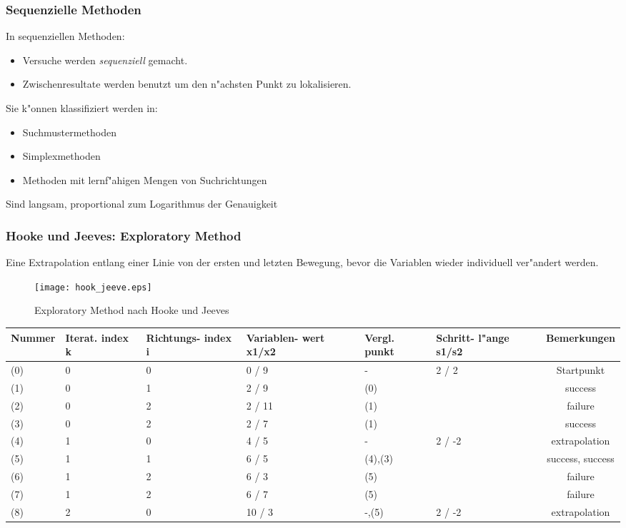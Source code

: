 \documentclass[german, 10pt, a4paper, twocolumn]{scrartcl}
\begin{document}
\subsubsection{Sequenzielle Methoden}

In sequenziellen Methoden:

\begin{itemize}
	\item Versuche werden \textit{sequenziell} gemacht.
	\item Zwischenresultate werden benutzt um den n"achsten Punkt zu lokalisieren.
\end{itemize}

Sie k"onnen klassifiziert werden in:

\begin{itemize}
	\item Suchmustermethoden
	\item Simplexmethoden
	\item Methoden mit lernf"ahigen Mengen von Suchrichtungen
\end{itemize}

Sind langsam, proportional zum Logarithmus der Genauigkeit

\subsubsection{Hooke und Jeeves: Exploratory Method}

Eine Extrapolation entlang einer Linie von der ersten und letzten Bewegung, bevor die Variablen wieder individuell ver"andert werden.

\begin{figure}[hbt]
 \begin{center}
 	\texttt{[image: hook\_jeeve.eps]}
 \end{center}
 \label{hook_jeeves}
 \caption{Exploratory Method nach Hooke und Jeeves}
\end{figure}

\tiny
\begin{tabular}{p{0.8cm}|p{0.6cm}|p{1cm}|p{1cm}|p{0.5cm}|p{1cm}|c}
	Nummer &	Iterat. index k &	Richtungs- index i &	Variablen- wert x1/x2 &		Vergl. punkt &		Schritt- l"ange s1/s2 &		Bemerkungen  \\ \hline
	(0) &		0 &			0 &			0 / 9 &				- &			2 / 2 &				Startpunkt \\
	(1) &		0 &			1 &			2 / 9 &				(0) &			&				success \\
	(2) &		0 &			2 &			2 / 11 &			(1) &			&				failure \\
	(3) &		0 &			2 &			2 / 7 &				(1) &			&				success \\
	(4) &		1 &			0 &			4 / 5 &				- &			2 / -2 &			extrapolation\\
	(5) &		1 &			1 &			6 / 5 &				(4),(3) &		&				success, success\\
	(6) &		1 &			2 &			6 / 3 &				(5) &			&				failure\\
	(7) &		1 &			2 &			6 / 7 &				(5) &			&				failure\\
	(8) &		2 &			0 &			10 / 3 &			-,(5) &			2 / -2 &			extrapolation
\end{tabular}
\normalsize
\end{document}
